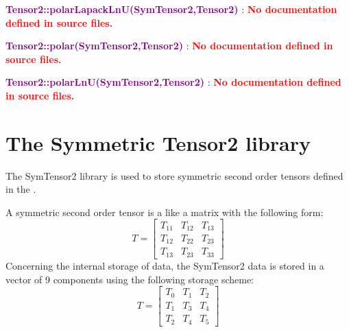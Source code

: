
\textcolor{purple}{\textbf{Tensor2::polarLapackLnU(SymTensor2,Tensor2)}}\label{Tensor2::polarLapackLnU(SymTensor2,Tensor2)} : \textcolor{red}{\textbf{No documentation defined in source files.}}


\textcolor{purple}{\textbf{Tensor2::polar(SymTensor2,Tensor2)}}\label{Tensor2::polar(SymTensor2,Tensor2)} : \textcolor{red}{\textbf{No documentation defined in source files.}}


\textcolor{purple}{\textbf{Tensor2::polarLnU(SymTensor2,Tensor2)}}\label{Tensor2::polarLnU(SymTensor2,Tensor2)} : \textcolor{red}{\textbf{No documentation defined in source files.}}



\section{The Symmetric Tensor2 library}

The SymTensor2 library is used to store symmetric second order tensors defined in the \DynELA.

A symmetric second order tensor is a like a matrix with the following form:
\begin{equation}
T=\left[\begin{array}{ccc}
  T_{11} & T_{12} & T_{13}\\
  T_{12} & T_{22} & T_{23}\\
  T_{13} & T_{23} & T_{33}
  \end{array}\right]
\end{equation}
Concerning the internal storage of data, the SymTensor2 data is stored in a vector of 9 components using the following storage scheme:
\begin{equation}
T=\left[\begin{array}{ccc}
    T_{0} & T_{1} & T_{2}\\
    T_{1} & T_{3} & T_{4}\\
    T_{2} & T_{4} & T_{5}
    \end{array}\right]
\end{equation}

